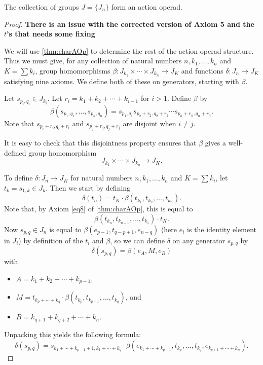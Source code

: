 \begin{thm}\label{J_aop}
The collection of groups $J = \{ J_{n} \}$ form an action operad.
\end{thm}
\begin{proof}
\textbf{There is an issue with the corrected version of Axiom 5 and the $t$'s that needs some fixing}

We will use \cref{thm:charAOp} to determine the rest of the action operad structure. Thus we must give, for any collection of natural numbers $n, k_{1}, \ldots, k_{n}$ and $K = \sum k_{i}$, group homomorphisms $\beta \colon J_{k_{1}} \times \cdots \times J_{k_{n}} \rightarrow J_{K}$ and functions $\delta \colon J_{n} \rightarrow J_{K}$ satisfying nine axioms. We define both of these on generators, starting with $\beta$.

Let $s_{p_{i}, q_{i}} \in J_{k_{i}}$. Let $r_{i} = k_{1} + k_{2} + \cdots + k_{i-1}$ for $i > 1$. Define $\beta$ by
  \[
    \beta(s_{p_{1}, q_{1}}, \ldots, s_{p_{n}, q_{n}}) = s_{p_{1}, q_{1}} s_{p_{2}+r_{2}, q_{2}+r_{2}} \cdots s_{p_{n}+r_{n}, q_{n}+r_{n}}.
  \]
Note that $s_{p_{i}+r_{i}, q_{i}+r_{i}}$ and $s_{p_{j}+r_{j}, q_{j}+r_{j}}$ are disjoint when $i \neq j$.

It is easy to check that this disjointness property ensures that $\beta$ gives a well-defined group homomorphism
  \[
    J_{k_{1}} \times \cdots \times J_{k_{n}} \rightarrow J_{K}.
  \]

To define $\delta \colon J_{n} \rightarrow J_{K}$ for natural numbers $n, k_{1}, \ldots, k_{n}$ and $K = \sum k_{i}$, let $t_{k} = s_{1,k} \in J_{k}$. Then we start by defining
  \[
    \delta(t_{n}) = t_{K} \cdot \beta(t_{k_{1}}, t_{k_{2}}, \ldots, t_{k_{n}}).
  \]
Note that, by Axiom \ref{eq8} of \cref{thm:charAOp}, this is equal to
  \[
    \beta(t_{k_{n}}, t_{k_{n-1}}, \ldots, t_{k_{1}}) \cdot t_{K}.
  \]
Now $s_{p,q} \in J_{n}$ is equal to $\beta(e_{p-1}, t_{q-p+1}, e_{n-q})$ (here $e_{i}$ is the identity element in $J_{i}$) by definition of the $t_{i}$ and $\beta$, so we can define $\delta$ on any generator $s_{p,q}$ by
  \[
    \delta(s_{p,q}) = \beta ( e_{A}, M, e_{B} )
  \]
with
  \begin{itemize}
    \item $A = k_{1} + k_{2} + \cdots + k_{p-1}$,
    \item $M = t_{k_{p}+ \cdots +k_{q}} \cdot \beta(t_{k_{p}}, t_{k_{p+1}}, \ldots, t_{k_{q}})$, and
    \item $B = k_{q+1} + k_{q+2} + \cdots + k_{n}$.
  \end{itemize}
Unpacking this yields the following formula:
  \[
  \delta(s_{p,q}) = s_{k_{1}+\cdots+k_{p-1}+1, k_{1}+\cdots+k_{q}} \cdot \beta(e_{k_{1}+\cdots+k_{p-1}}, t_{k_{p}}, \ldots, t_{k_{q}}, e_{k_{q+1}+\cdots+k_{n}}).
  \]


\end{proof}
